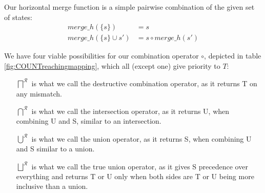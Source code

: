 Our horizontal merge function is a simple pairwise combination of the given set of states:
\begin{align}
merge\_h(\{s\}) &= s\\
merge\_h(\{s\} \cup s') &= s \circ merge\_h(s')
\end{align}

We have four viable possibilities for our combination operator $\circ$, depicted in table \ref{fig:COUNTreachingmapping}, which all (except one) give priority to $T$:
\begin{itemize}
\item [$\bigsqcap^{\mathcal{R}}$] is what we call the destructive combination operator, as it returns T on any mismatch.
\item [$\bigcap^{\mathcal{R}}$] is what we call the intersection operator, as it returns U, when combining U and S, similar to an intersection.
\item [$\bigcup^{\mathcal{R}}$] is what we call the union operator, as it returns S, when combining U and S similar to a union.
\item [$\bigsqcup^{\mathcal{R}}$] is what we call the true union operator, as it gives S precedence over everything and returns T or 
U only when both sides are T or U being more inclusive than a union.
\end{itemize}


\begin{table}
{
}

\caption{Different mappings for combining two reaching state values in horizontal matching for the \emph{count} policy.}

\label{fig:COUNTreachingmapping}
\end{table}



